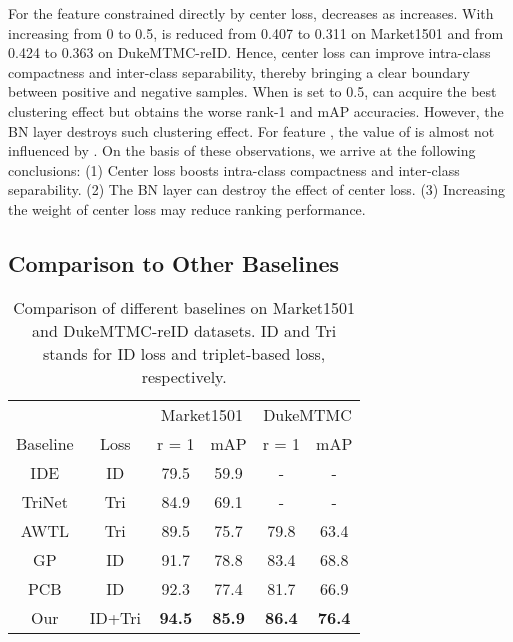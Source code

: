 \documentclass[journal]{IEEEtran}
\begin{document}
For the feature  constrained directly by center loss,  decreases as  increases.
With  increasing from 0 to 0.5,  is reduced from 0.407 to 0.311 on Market1501 and from 0.424 to 0.363 on DukeMTMC-reID.
Hence, center loss can improve intra-class compactness and inter-class separability, thereby bringing a clear boundary between positive and negative samples.
When  is set to 0.5,  can acquire the best clustering effect but obtains the worse rank-1 and mAP accuracies. However, the BN layer destroys such clustering effect.
For feature , the value of  is almost not influenced by .
On the basis of these observations, we arrive at the following conclusions:
(1) Center loss boosts intra-class compactness and inter-class separability.
(2) The BN layer can destroy the effect of center loss.
(3) Increasing the weight of center loss may reduce ranking performance.



\subsection{Comparison to Other Baselines}

\renewcommand{\multirowsetup}{\centering}
\begin{table}[tb]\footnotesize
  \begin{center}
  \begin{tabular}{ c|c|cc|cc}
\hline
    		&		       & \multicolumn{2}{c|}{Market1501} & \multicolumn{2}{c}{DukeMTMC}	 \\
  Baseline   & Loss	       & r = 1 	& mAP	&r = 1 	& mAP 	 \\
 	\hline
	\hline
    IDE\cite{zheng2018discriminatively}     & ID            & 79.5	& 59.9	& -	&-            \\
    TriNet\cite{hermans2017defense}  & Tri           & 84.9	& 69.1	& -	& -		\\
    AWTL\cite{ristani2018features}    & Tri           & 89.5	& 75.7	& 79.8	& 63.4		\\
    GP\cite{xiong2019good}     & ID	        &91.7   &78.8	&83.4   &68.8       \\
    PCB\cite{sun2018beyond}     & ID            & 92.3	&77.4	&81.7	&66.9		\\
    Our     & ID+Tri        &\textbf{94.5}	&\textbf{85.9}	&\textbf{86.4}	&\textbf{76.4}		\\
\hline

  \end{tabular}
  \end{center}
  \caption{\label{tab:bs} Comparison of different baselines on Market1501 and DukeMTMC-reID datasets. ID and Tri stands for ID loss and triplet-based loss, respectively.}
\vspace{-2mm}
\end{table}
\end{document}

